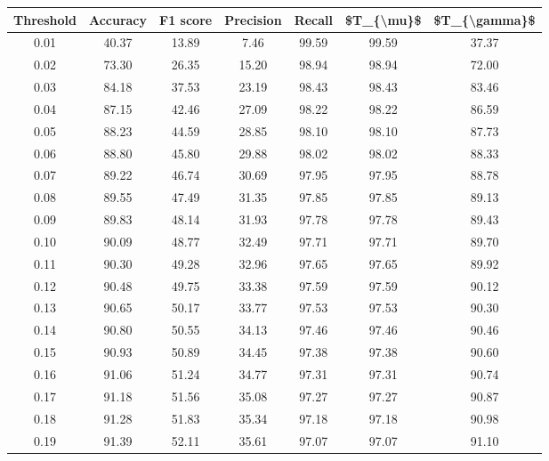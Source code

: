 \begin{tabular}{|c|c|c|c|c|c|c|}
\toprule
 Threshold &  Accuracy &  F1 score &  Precision &  Recall &  \$T\_\{\textbackslash mu\}\$ &  \$T\_\{\textbackslash gamma\}\$ \\
\hline
      0.01 &     40.37 &     13.89 &       7.46 &   99.59 &      99.59 &         37.37 \\
      0.02 &     73.30 &     26.35 &      15.20 &   98.94 &      98.94 &         72.00 \\
      0.03 &     84.18 &     37.53 &      23.19 &   98.43 &      98.43 &         83.46 \\
      0.04 &     87.15 &     42.46 &      27.09 &   98.22 &      98.22 &         86.59 \\
      0.05 &     88.23 &     44.59 &      28.85 &   98.10 &      98.10 &         87.73 \\
      0.06 &     88.80 &     45.80 &      29.88 &   98.02 &      98.02 &         88.33 \\
      0.07 &     89.22 &     46.74 &      30.69 &   97.95 &      97.95 &         88.78 \\
      0.08 &     89.55 &     47.49 &      31.35 &   97.85 &      97.85 &         89.13 \\
      0.09 &     89.83 &     48.14 &      31.93 &   97.78 &      97.78 &         89.43 \\
      0.10 &     90.09 &     48.77 &      32.49 &   97.71 &      97.71 &         89.70 \\
      0.11 &     90.30 &     49.28 &      32.96 &   97.65 &      97.65 &         89.92 \\
      0.12 &     90.48 &     49.75 &      33.38 &   97.59 &      97.59 &         90.12 \\
      0.13 &     90.65 &     50.17 &      33.77 &   97.53 &      97.53 &         90.30 \\
      0.14 &     90.80 &     50.55 &      34.13 &   97.46 &      97.46 &         90.46 \\
      0.15 &     90.93 &     50.89 &      34.45 &   97.38 &      97.38 &         90.60 \\
      0.16 &     91.06 &     51.24 &      34.77 &   97.31 &      97.31 &         90.74 \\
      0.17 &     91.18 &     51.56 &      35.08 &   97.27 &      97.27 &         90.87 \\
      0.18 &     91.28 &     51.83 &      35.34 &   97.18 &      97.18 &         90.98 \\
      0.19 &     91.39 &     52.11 &      35.61 &   97.07 &      97.07 &         91.10 \\

\end{tabular}
